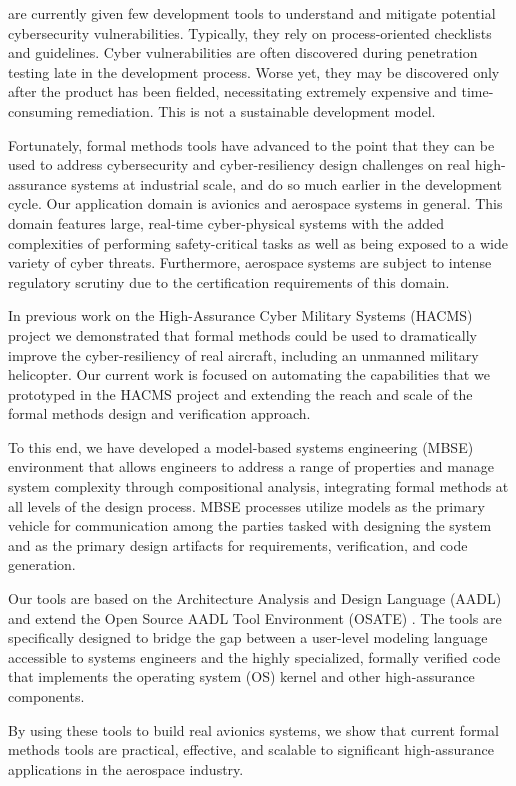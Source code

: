  are currently given few
development tools to understand and mitigate 
potential cybersecurity vulnerabilities.  Typically, they rely on
process-oriented checklists and guidelines. Cyber vulnerabilities
are often discovered during penetration testing late in the
development process. Worse yet, they may be discovered
only after the product has been fielded, necessitating extremely
expensive and time-consuming remediation. This is not a
sustainable development model.

Fortunately, formal methods tools have advanced to the point that they can 
be used to address cybersecurity and cyber-resiliency design challenges
on real high-assurance systems at industrial scale, and do so much earlier in
the development cycle.  Our application domain is avionics and aerospace systems in general.  
This domain features large, real-time cyber-physical systems with the added 
complexities of performing safety-critical tasks as well as being exposed to 
a wide variety of cyber threats.  Furthermore, aerospace systems are subject 
to intense regulatory scrutiny due to the certification requirements of this domain. 

In previous work on the High-Assurance Cyber Military Systems (HACMS) project \cite{HACMS}
we demonstrated that formal methods could be used to dramatically improve the 
cyber-resiliency of real aircraft, including an unmanned military helicopter.  Our current
work is focused on automating the capabilities that we prototyped in the HACMS project
and extending the reach and scale of the formal methods design and verification approach.  

To this end, we have developed a model-based systems engineering (MBSE) 
environment that allows engineers to address a range of properties and 
manage system complexity through compositional analysis, integrating formal methods
at all levels of the design process.  MBSE processes utilize models as the primary vehicle for 
communication among the parties tasked with designing the system and as the primary 
design artifacts for requirements, verification, and code generation.  

Our tools are based on the 
Architecture Analysis and Design Language (AADL) and extend the Open Source
AADL Tool Environment (OSATE) \cite{feiler-aadl}.  The tools are specifically designed 
to bridge the gap between a user-level modeling language accessible to systems 
engineers and the highly specialized, formally verified code that implements the operating system (OS)
kernel and other high-assurance components.   

By using these tools to build real avionics systems, we show 
that current formal methods tools are practical, effective, and scalable to significant 
high-assurance applications in the aerospace industry.  
